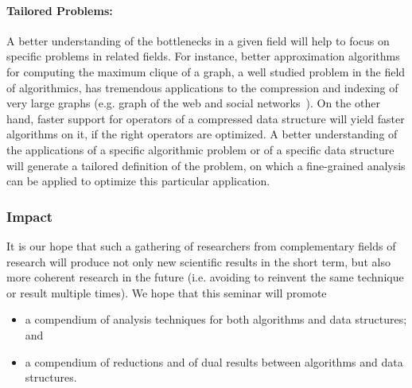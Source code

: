 \documentclass[a4paper,10pt]{article}
\begin{document}
\paragraph{Tailored Problems:}

A better understanding of the bottlenecks in a given field will help to focus on specific problems in related fields.
%
For instance, better approximation algorithms for computing the maximum clique of a graph, a well studied problem in the field of algorithmics, has tremendous applications to the compression and indexing of very large graphs (e.g. graph of the web and social networks~\cite{HNkais13}).  On the other hand, faster support for operators of a compressed data structure will yield faster algorithms on it, if the right operators are optimized.
%
A better understanding of the applications of a specific algorithmic problem or of a specific data structure will generate a tailored definition of the problem, on which a fine-grained analysis can be applied to optimize this particular application.




\subsubsection{Impact}
\label{sec:impact}

It is our hope that such a gathering of researchers from complementary fields of research will produce not only new scientific results in the short term, but also more coherent research in the future (i.e. avoiding to reinvent the same technique or result multiple times). We hope that this seminar will promote
\begin{itemize}
\item a compendium of  analysis techniques for both algorithms and data structures;  and
\item a compendium of reductions and of dual results between algorithms and data structures.
\end{itemize}

\end{document}
